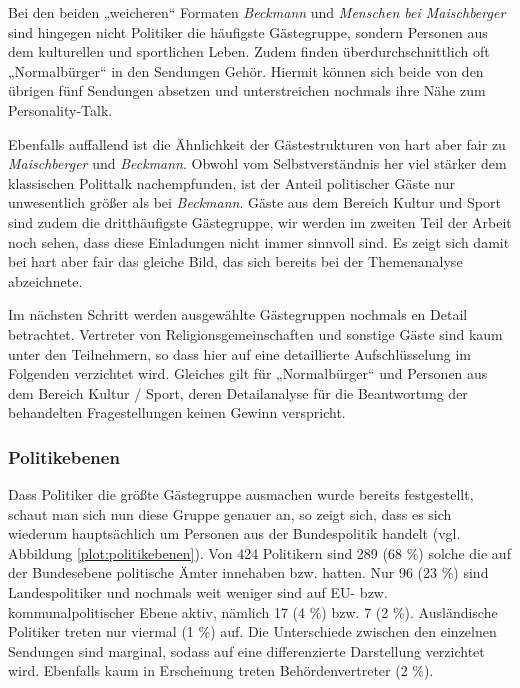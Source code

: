 Bei den beiden „weicheren“ Formaten \textit{Beckmann} und \textit{Menschen bei Maischberger} sind hingegen nicht Politiker die häufigste Gästegruppe, sondern Personen aus dem kulturellen und sportlichen Leben. Zudem finden überdurchschnittlich oft „Normalbürger“ in den Sendungen Gehör. Hiermit können sich beide von den übrigen fünf Sendungen absetzen und unterstreichen nochmals ihre Nähe zum Personality-Talk.

Ebenfalls auffallend ist die Ähnlichkeit der Gästestrukturen von hart aber fair zu \textit{Maischberger} und \textit{Beckmann}. Obwohl vom Selbstverständnis her viel stärker dem klassischen Polittalk nachempfunden, ist der Anteil politischer Gäste nur unwesentlich größer als bei \textit{Beckmann}. Gäste aus dem Bereich Kultur und Sport sind zudem die dritthäufigste Gästegruppe, wir werden im zweiten Teil der Arbeit noch sehen, dass diese Einladungen nicht immer sinnvoll sind. Es zeigt sich damit bei hart aber fair das gleiche Bild, das sich bereits bei der Themenanalyse abzeichnete.

Im nächsten Schritt werden ausgewählte Gästegruppen nochmals en Detail betrachtet. Vertreter von Religionsgemeinschaften und sonstige Gäste sind kaum unter den Teilnehmern, so dass hier auf eine detaillierte Aufschlüsselung im Folgenden verzichtet wird. Gleiches gilt für „Normalbürger“ und Personen aus dem Bereich Kultur / Sport, deren Detailanalyse für die Beantwortung der behandelten Fragestellungen keinen Gewinn verspricht.

\subsubsection{Politikebenen}

Dass Politiker die größte Gästegruppe ausmachen wurde bereits festgestellt, schaut man sich nun diese Gruppe genauer an, so zeigt sich, dass es sich wiederum hauptsächlich um Personen aus der Bundespolitik handelt (vgl. Abbildung \vref{plot:politikebenen}). Von 424 Politikern sind 289 (68 \%) solche die auf der Bundesebene politische Ämter innehaben bzw. hatten. Nur 96 (23 \%) sind Landespolitiker und nochmals weit weniger sind auf EU- bzw. kommunalpolitischer Ebene aktiv, nämlich 17 (4 \%) bzw. 7 (2 \%). Ausländische Politiker treten nur viermal (1 \%) auf. Die Unterschiede zwischen den einzelnen Sendungen sind marginal, sodass auf eine differenzierte Darstellung verzichtet wird. Ebenfalls kaum in Erscheinung treten Behördenvertreter (2 \%).

